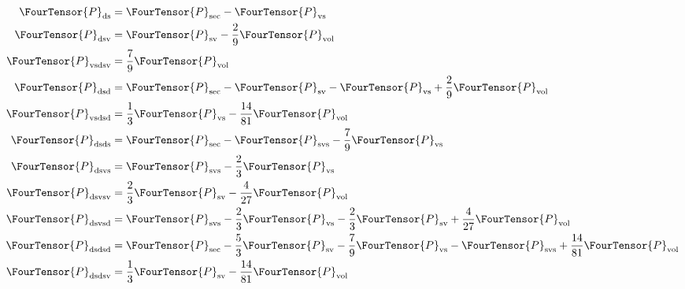 \begin{equation}
    \begin{aligned}
    \FourTensor{P}_{\mathrm{ds}} 
        &= \FourTensor{P}_{\mathrm{sec}} - \FourTensor{P}_{\mathrm{vs}} \\
    \FourTensor{P}_{\mathrm{dsv}} 
        &= \FourTensor{P}_{\mathrm{sv}} - \frac{2}{9}\FourTensor{P}_{\mathrm{vol}} \\
    \FourTensor{P}_{\mathrm{vsdsv}} 
        &= \frac{7}{9}\FourTensor{P}_{\mathrm{vol}} \\
    \FourTensor{P}_{\mathrm{dsd}} 
        &= \FourTensor{P}_{\mathrm{sec}} - \FourTensor{P}_{\mathrm{sv}} - \FourTensor{P}_{\mathrm{vs}} + \frac{2}{9}\FourTensor{P}_{\mathrm{vol}} \\
    \FourTensor{P}_{\mathrm{vsdsd}} 
        &=\frac{1}{3} \FourTensor{P}_{\mathrm{vs}} 
        - \frac{14}{81} \FourTensor{P}_{\mathrm{vol}}
        \\
    \FourTensor{P}_{\mathrm{dsds}} 
        &= \FourTensor{P}_{\mathrm{sec}} - \FourTensor{P}_{\mathrm{svs}} - \frac{7}{9}\FourTensor{P}_{\mathrm{vs}} \\
    \FourTensor{P}_{\mathrm{dsvs}} 
        &= \FourTensor{P}_{\mathrm{svs}} - \frac{2}{3}\FourTensor{P}_{\mathrm{vs}}  \\
    \FourTensor{P}_{\mathrm{dsvsv}}
        &= \frac{2}{3} \FourTensor{P}_{\mathrm{sv}} 
         - \frac{4}{27} \FourTensor{P}_{\mathrm{vol}} \\
    \FourTensor{P}_{\mathrm{dsvsd}}
        &= \FourTensor{P}_{\mathrm{svs}} 
         - \frac{2}{3} \FourTensor{P}_{\mathrm{vs}} 
         - \frac{2}{3} \FourTensor{P}_{\mathrm{sv}} 
         + \frac{4}{27} \FourTensor{P}_{\mathrm{vol}} \\
    \FourTensor{P}_{\mathrm{dsdsd}}
        &= \FourTensor{P}_{\mathrm{sec}} 
         - \frac{5}{3}\FourTensor{P}_{\mathrm{sv}}
         - \frac{7}{9} \FourTensor{P}_{\mathrm{vs}}
         - \FourTensor{P}_{\mathrm{svs}}
         + \frac{14}{81} \FourTensor{P}_{\mathrm{vol}}\\
    \FourTensor{P}_{\mathrm{dsdsv}}
        &= \frac{1}{3}\FourTensor{P}_{\mathrm{sv}}
         - \frac{14}{81} \FourTensor{P}_{\mathrm{vol}}
    \end{aligned}
\end{equation}